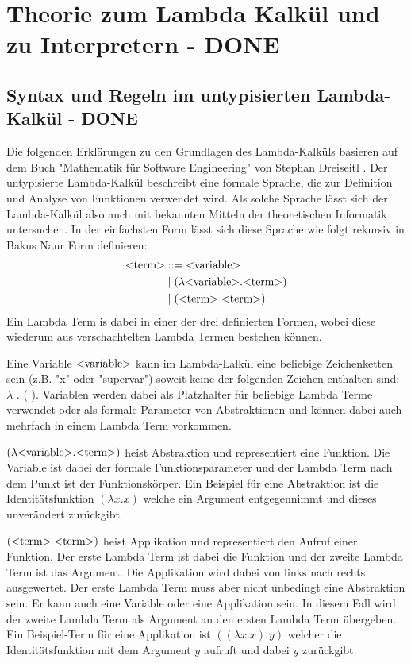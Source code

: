 \documentclass[ngerman]{article}
\begin{document}
\section{Theorie zum Lambda Kalkül und zu Interpretern - DONE}

\subsection{Syntax und Regeln im untypisierten Lambda-Kalkül - DONE}

Die folgenden Erklärungen zu den Grundlagen des Lambda-Kalküls basieren auf dem Buch "Mathematik für Software Engineering" von Stephan Dreiseitl \cite*{Dreiseitl2018}.
Der untypisierte Lambda-Kalkül beschreibt eine formale Sprache, die zur Definition und Analyse von Funktionen verwendet wird. Als solche Sprache lässt sich der Lambda-Kalkül also auch mit bekannten Mitteln der theoretischen Informatik untersuchen. 
In der einfachsten Form lässt sich diese Sprache wie folgt rekursiv in Bakus Naur Form definieren:
\begin{align*}
    \text{\textless term\textgreater} & ::= \text{\textless variable\textgreater} \\
                      & \; | \; ( \lambda \text{\textless variable\textgreater} . \text{\textless term\textgreater} )\\
                      & \; | \; (\text{\textless term\textgreater} \; \text{\textless term\textgreater})
\end{align*}
Ein Lambda Term is dabei in einer der drei definierten Formen, wobei diese wiederum aus verschachtelten Lambda Termen bestehen können.

Eine Variable $\text{\textless variable\textgreater}$ kann im Lambda-Lalkül eine beliebige Zeichenketten sein (z.B. "x" oder "supervar") soweit keine der folgenden Zeichen enthalten sind: $\lambda$ . ( ). Variablen werden dabei als Platzhalter für beliebige Lambda Terme verwendet oder als formale Parameter von Abstraktionen und können dabei auch mehrfach in einem Lambda Term vorkommen.

$(\lambda \text{\textless variable\textgreater} . \text{\textless term\textgreater})$ heist Abstraktion und representiert eine Funktion. Die Variable ist dabei der formale Funktionsparameter und der Lambda Term nach dem Punkt ist der Funktionskörper. Ein Beispiel für eine Abstraktion ist die Identitätsfunktion $(\lambda x.x)$ welche ein Argument entgegennimmt und dieses unverändert zurückgibt.

$(\text{\textless term\textgreater} \; \text{\textless term\textgreater})$ heist Applikation und representiert den Aufruf einer Funktion. Der erste Lambda Term ist dabei die Funktion und der zweite Lambda Term ist das Argument. Die Applikation wird dabei von links nach rechts ausgewertet. Der erste Lambda Term muss aber nicht unbedingt eine Abstraktion sein. Er kann auch eine Variable oder eine Applikation sein. In diesem Fall wird der zweite Lambda Term als Argument an den ersten Lambda Term übergeben. Ein Beispiel-Term für eine Applikation ist $((\lambda x.x) \; y)$ welcher die Identitätsfunktion mit dem Argument $y$ aufruft und dabei $y$ zurückgibt.
\end{document}
